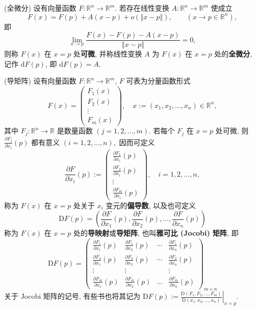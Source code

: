 \begin{definition}{(全微分)}
设有向量函数 $F:\mathbb{R}^{n}\rightarrow\mathbb{R}^{m}$. 若存在线性变换 $A:\mathbb{R}^{n}\rightarrow\mathbb{R}^{m}$
使成立
\[
F(x)=F(p)+A(x-p)+o(\left\Vert x-p\right\Vert ),\quad\quad(x\rightarrow p\in\mathbb{R}^{n}),
\]
即
\[
{\displaystyle \lim_{x\rightarrow p}{\displaystyle \frac{F(x)-F(p)-A(x-p)}{\left\Vert x-p\right\Vert }=0,}}
\]
则称 $F(x)$ 在 $x=p$ 处\textbf{可微}, 并称线性变换 $A$ 为 $F(x)$ 在 $x=p$ 处的\textbf{全微分},
记作 $\mathrm{d}F(p)$, 即 $\mathrm{d}F(p)=A.$ 
\end{definition}

\begin{definition}{(导矩阵)}
设有向量函数 $F:\mathbb{R}^{n}\rightarrow\mathbb{R}^{m}$, $F$ 可表为分量函数形式
$$
F(x)=\left(\begin{array}{c}
F_{1}(x)\\
F_{2}(x)\\
\vdots\\
F_{m}(x)
\end{array}\right),\quad x:=(x_{1},x_{2},\ldots,x_{n})\in\mathbb{R}^{n},
$$
其中 $F_{j}:\mathbb{R}^{n}\rightarrow\mathbb{R}$ 是数量函数 $(j=1,2,\ldots,m)$.
若每个 $F_{j}$ 在 $x=p$ 处可微, 则 ${\displaystyle \frac{\partial F_{j}}{\partial x_{i}}(p)}$
都有意义 $(i=1,2,\ldots,n),$ 因而可定义
$$
{\displaystyle \frac{\partial F}{\partial x_{i}}(p):=\left(\begin{array}{c}
\frac{\partial F_{1}}{\partial x_{i}}(p)\\
\frac{\partial F_{2}}{\partial x_{i}}(p)\\
\vdots\\
\frac{\partial F_{m}}{\partial x_{i}}(p)
\end{array}\right),\quad i=1,2,\ldots,n,}
$$
称为 $F(x)$ 在 $x=p$ 处关于 $x_{i}$ 变元的\textbf{偏导数}, 以及也可定义
\[
\mathrm{D}F(p)=(\frac{\partial F}{\partial x_{1}}(p),\frac{\partial F}{\partial x_{2}}(p),\ldots,\frac{\partial F}{\partial x_{n}}(p))
\]
称为 $F(x)$ 在 $x=p$ 处的\textbf{导映射}或\textbf{导矩阵}, 也叫\textbf{雅可比 (Jocobi)
矩阵}, 即
$$
\mathrm{D}F(p)=\left(\begin{array}{cccc}
\frac{\partial F_{1}}{\partial x_{1}}(p) & \frac{\partial F_{1}}{\partial x_{2}}(p) & \cdots & \frac{\partial F_{1}}{\partial x_{n}}(p)\\
\frac{\partial F_{2}}{\partial x_{1}}(p) & \frac{\partial F_{2}}{\partial x_{2}}(p) & \cdots & \frac{\partial F_{2}}{\partial x_{n}}(p)\\
\vdots & \vdots &  & \vdots\\
\frac{\partial F_{m}}{\partial x_{1}}(p) & \frac{\partial F_{m}}{\partial x_{2}}(p) & \ldots & \frac{\partial F_{m}}{\partial x_{n}}(p)
\end{array}\right)_{m\times n}
$$
关于 Jocobi 矩阵的记号, 有些书也将其记为 $\mathrm{D}F(p):={\displaystyle \left.\frac{\mathrm{D}(F_{1},F_{2},\ldots,F_{m})}{\mathrm{D}(x_{1},x_{2},\ldots,x_{n})}\right|_{x=p}.}$
\end{definition}



